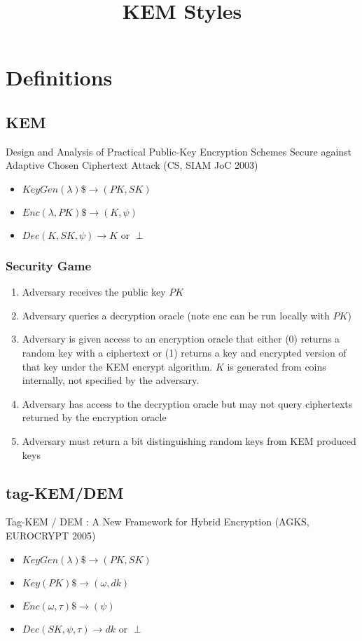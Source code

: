 \documentclass[11pt, pdftex]{article}
\title{KEM Styles}
\author{}
\date{}
\begin{document}
\maketitle

\section{Definitions}

\subsection{KEM}
Design and Analysis of Practical Public-Key Encryption Schemes Secure against Adaptive Chosen Ciphertext Attack (CS, SIAM JoC 2003)
\begin{itemize}
\item $KeyGen(\lambda) \$\rightarrow (PK, SK)$
\item $Enc(\lambda, PK) \$\rightarrow (K, \psi)$
\item $Dec(K, SK, \psi) \rightarrow K \text{ or } \perp$
\end{itemize}

\subsubsection{Security Game}
\begin{enumerate}
\item Adversary receives the public key $PK$
\item Adversary queries a decryption oracle (note enc can be run locally with $PK$)
\item Adversary is given access to an encryption oracle that either (0) returns a random key with a ciphertext or (1) returns a key and encrypted version of that key under the KEM encrypt algorithm.  $K$ is generated from coins internally, not specified by the adversary.
\item Adversary has access to the decryption oracle but may not query ciphertexts returned by the encryption oracle
\item Adversary must return a bit distinguishing random keys from KEM produced keys
\end{enumerate}

\subsection{tag-KEM/DEM} 
Tag-KEM / DEM : A New Framework for Hybrid Encryption (AGKS, EUROCRYPT 2005)
\begin{itemize}
\item $KeyGen(\lambda) \$\rightarrow (PK, SK)$
\item $Key(PK) \$\rightarrow (\omega, dk)$
\item $Enc(\omega, \tau) \$\rightarrow (\psi)$
\item $Dec(SK, \psi, \tau) \rightarrow dk \text{ or } \perp$
\end{itemize}
\end{document}
